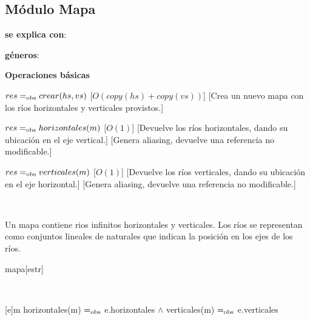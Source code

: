 \subsection{Módulo Mapa}

\begin{Interfaz}
\textbf{se explica con}: 

\textbf{géneros}: 

{\textbf{\large Operaciones básicas}}

{$res =_{\mathrm{obs}} crear(hs, vs)$}
[$O(copy(hs) + copy(vs))$]
[Crea un nuevo mapa con los ríos horizontales y verticales provistos.]

{$res =_{\mathrm{obs}} horizontales(m)$}
[$O(1)$]
[Devuelve los ríos horizontales, dando su ubicación en el eje vertical.]
[Genera aliasing, devuelve una referencia no modificable.]

{$res =_{\mathrm{obs}} verticales(m)$}
[$O(1)$]
[Devuelve los ríos verticales, dando su ubicación en el eje horizontal.]
[Genera aliasing, devuelve una referencia no modificable.]

\end{Interfaz}

~

\begin{Representacion}

Un mapa contiene rios infinitos horizontales y verticales. Los ríos se
representan como conjuntos lineales de naturales que indican la posición en
los ejes de los ríos.

\begin{Estructura}{mapa}[estr]
    \begin{Tupla}[estr]
    \end{Tupla}
\end{Estructura}


~

[e]{m}{
    horizontales(m) $=_{\mathrm{obs}}$ e.horizontales $\land$
    verticales(m) $=_{\mathrm{obs}}$ e.verticales
}

\end{Representacion}

~

